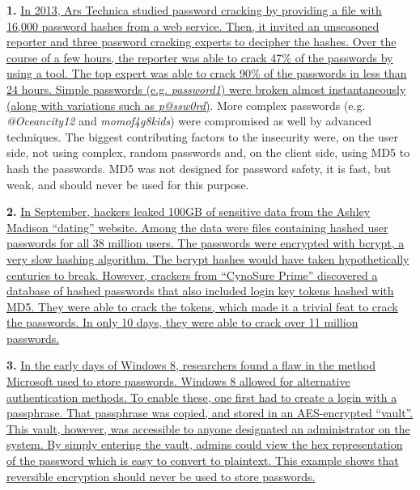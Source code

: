 \documentclass[12pt]{extarticle}
\begin{document}
	\noindent\textbf{1. }\href{http://arstechnica.com/security/2013/05/how-crackers-make-minced-meat-out-of-your-passwords/1/}{In 2013, Ars Technica studied password cracking by providing a file with 16,000 password hashes from a web service. Then, it invited an unseasoned reporter and three password cracking experts to decipher the hashes. Over the course of a few hours, the reporter was able to crack 47\% of the passwords by using a tool. The top expert was able to crack 90\% of the passwords in less than 24 hours. Simple passwords (e.g. \textit{password1}) were broken almost instantaneously (along with variations such as \textit{p@ssw0rd})}. More complex passwords (e.g. \textit{@Oceancity12} and \textit{momof4g8kids}) were compromised as well by advanced techniques. The biggest contributing factors to the insecurity were, on the user side, not using complex, random passwords and, on the client side, using MD5 to hash the passwords. MD5 was not designed for password safety, it is fast, but weak, and should never be used for this purpose.\newline
	
	\noindent\textbf{2. }\href{http://thehackernews.com/2015/09/ashley-madison-password-cracked.html}{In September, hackers leaked 100GB of sensitive data from the Ashley Madison ``dating'' website. Among the data were files containing hashed user passwords for all 38 million users. The passwords were encrypted with bcrypt, a very slow hashing algorithm. The bcrypt hashes would have taken hypothetically centuries to break. However, crackers from ``CynoSure Prime'' discovered a database of hashed passwords that also included login key tokens hashed with MD5. They were able to crack the tokens, which made it a trivial feat to crack the passwords. In only 10 days, they were able to crack over 11 million passwords.}\newline
	
	\noindent\textbf{3. }\href{http://www.hotforsecurity.com/blog/windows-8-stores-logon-passwords-in-plain-text-3914.html}{In the early days of Windows 8, researchers found a flaw in the method Microsoft used to store passwords. Windows 8 allowed for alternative authentication methods. To enable these, one first had to create a login with a passphrase. That passphrase was copied, and stored in an AES-encrypted ``vault''. This vault, however, was accessible to anyone designated an administrator on the system. By simply entering the vault, admins could view the hex representation of the password which is easy to convert to plaintext. This example shows that reversible encryption should never be used to store passwords.}
	
\end{document}
